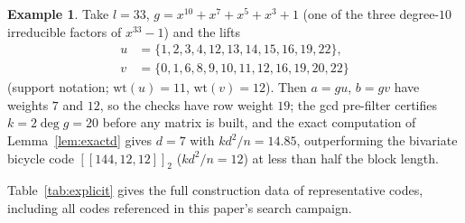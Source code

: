 \documentclass[journal,onecolumn]{IEEEtran}
\theoremstyle{definition}
\newtheorem{example}[theorem]{Example}
\theoremstyle{remark}
\newcommand{\wt}{\mathrm{wt}}
\begin{document}
\begin{example}\label{ex:66}
Take $l=33$, $g=x^{10}+x^{7}+x^{5}+x^{3}+1$ (one of the three degree-$10$
irreducible factors of $x^{33}-1$) and the lifts
\[
\begin{aligned}
u&=\{1,2,3,4,12,13,14,15,16,19,22\},\\
v&=\{0,1,6,8,9,10,11,12,16,19,20,22\}
\end{aligned}
\]
(support notation; $\wt(u)=11$, $\wt(v)=12$). Then
$a=gu$, $b=gv$ have weights $7$ and $12$, so the checks have row weight
$19$; the gcd pre-filter certifies $k=2\deg g=20$ before any matrix is
built, and the exact computation of Lemma~\ref{lem:exactd} gives $d=7$
with $kd^2/n=14.85$, outperforming the bivariate bicycle code
$[[144,12,12]]_2$ ($kd^2/n=12$) at less than half the block length.
\end{example}

Table~\ref{tab:explicit} gives the full construction data of representative
codes, including all codes referenced in this paper's search campaign.
\end{document}
